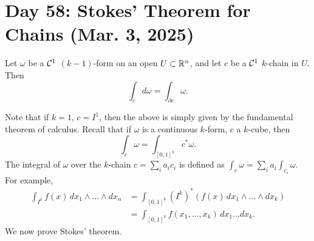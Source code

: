 \section{Day 58: Stokes' Theorem for Chains (Mar. 3, 2025)}
\begin{simplethm}
    Let $\omega$ be a $\mathcal C^1$ $(k-1)$-form on an open $U \subset \mathbb R^n$, and let $c$ be a $\mathcal C^1$ $k$-chain in $U$. Then
    \[ \int_c d\omega = \int_{\partial c} \omega. \]
\end{simplethm}
\noindent Note that if $k = 1$, $c = I^1$, then the above is simply given by the fundamental theorem of calculus. Recall that if $\omega$ is a continuous $k$-form, $c$ a $k$-cube, then
\[ \int_c \omega = \int_{[0, 1]^k} c^\ast \omega. \]
The integral of $\omega$ over the $k$-chain $c = \sum_i a_i c_i$ is defined as $\int_c \omega = \sum_i a_i \int_{c_i} \omega$. For example,
\begin{align*}
    \int_{I^k} f(x) \, dx_1 \wedge \dots \wedge dx_n &= \int_{[0, 1]^k} (I^k)^\ast \left(f(x) \, dx_1 \wedge \dots \wedge dx_k\right) \\
    &= \int_{[0, 1]^k} f(x_1, \dots, x_k) \, dx_1 \dots dx_k.
\end{align*}
We now prove Stokes' theorem.
